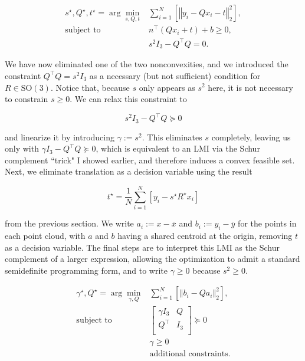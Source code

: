 \documentclass[conference]{IEEEtran}
\begin{document}
\begin{align}
	s^\star, Q^\star, t^\star = \arg\min_{s, Q, t} & \sum_{i=1}^N \left[\left\Vert y_i - Q x_i - t \right\Vert_2^2 \right] , \\
	\text{subject to } & n^\top (Q x_i + t) + b \ge 0 , \\
	& s^2 I_3 - Q^\top Q = 0 .
\end{align}

We have now eliminated one of the two nonconvexities, and we introduced the constraint \( Q^\top Q = s^2 I_3 \) as a necessary (but not sufficient) condition for \( R \in \mathrm{SO(3)} \).  Notice that, because \( s \) only appears as \( s^2 \) here, it is not necessary to constrain \( s \ge 0 \).  We can relax this constraint to

\begin{equation}
	s^2 I_3 - Q^\top Q \succeq 0
\end{equation}

and linearize it by introducing \( \gamma := s^2 \).  This eliminates \( s \) completely, leaving us only with \( \gamma I_3 - Q^\top Q \succeq 0 \), which is equivalent to an LMI via the Schur complement ``trick" I showed earlier, and therefore induces a convex feasible set.  Next, we eliminate translation as a decision variable using the result

\begin{equation}
	t^\star = \frac1N \sum_{i=1}^N \left[ y_i - s^\star R^\star x_i \right]
\end{equation}

from the previous section.  We write \( a_i := x - \bar{x} \) and \( b_i := y_i - \bar{y} \) for the points in each point cloud, with \( a \) and \( b \) having a shared centroid at the origin, removing \( t \) as a decision variable.  The final steps are to interpret this LMI as the Schur complement of a larger expression, allowing the optimization to admit a standard semidefinite programming form, and to write \( \gamma \ge 0 \) because \( s^2 \ge 0 \).

\begin{align}
	\gamma^\star, Q^\star = \arg\min_{\gamma, Q} & \sum_{i=1}^N \left[\left\Vert b_i - Q a_i \right\Vert_2^2 \right] , \\
	\text{subject to } & \begin{bmatrix}
		\gamma I_3 & Q \\
		Q^\top & I_3 \\
	\end{bmatrix} \succeq 0 \\
	& \gamma \ge 0 \\
	& \text{additional constraints} . \label{eq:addtl}
\end{align}
\end{document}
